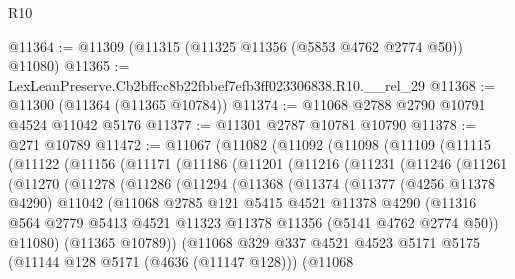 \begin{lexlean}{R10}
\begin{coremodule}
@11364 := @11309 (@11315 (@11325 @11356 (@5853 @4762 @2774 @50)) @11080)
@11365 := LexLeanPreserve.Cb2bffcc8b22fbbef7efb3ff023306838.R10.__rel_29
@11368 := @11300 (@11364 (@11365 @10784))
@11374 := @11068 @2788 @2790 @10791 @4524 @11042 @5176
@11377 := @11301 @2787 @10781 @10790
@11378 := @271 @10789
@11472 := @11067
    (@11082
      (@11092
        (@11098
          (@11109
            (@11115
              (@11122
                (@11156
                  (@11171
                    (@11186
                      (@11201
                        (@11216
                          (@11231
                            (@11246
                              (@11261
                                (@11270
                                  (@11278
                                    (@11286
                                      (@11294
                                        (@11368
                                          (@11374
                                            (@11377
                                              (@4256 @11378 @4290)
                                              @11042
                                              (@11068
                                                @2785
                                                @121
                                                @5415
                                                @4521
                                                @11378
                                                @4290
                                                (@11316
                                                  @564
                                                  @2779
                                                  @5413
                                                  @4521
                                                  @11323
                                                  @11378
                                                  @11356
                                                  (@5141 @4762 @2774 @50))
                                                @11080)
                                              (@11365 @10789))
                                            (@11068
                                              @329
                                              @337
                                              @4521
                                              @4523
                                              @5171
                                              @5175
                                              (@11144 @128 @5171 (@4636 (@11147 @128)))
                                              (@11068

\end{coremodule}
\end{lexlean}
